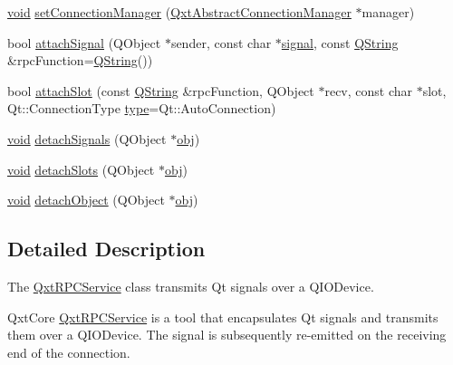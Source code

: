 \begin{DoxyCompactItemize}
\item 
\hyperlink{group___u_a_v_objects_plugin_ga444cf2ff3f0ecbe028adce838d373f5c}{void} \hyperlink{class_qxt_r_p_c_service_ae4246182fe7a84119fb37e90eb9cccf7}{set\-Connection\-Manager} (\hyperlink{class_qxt_abstract_connection_manager}{Qxt\-Abstract\-Connection\-Manager} $\ast$manager)
\item 
bool \hyperlink{class_qxt_r_p_c_service_adc5ae895c4fc3194254af52eda31aa6d}{attach\-Signal} (Q\-Object $\ast$sender, const char $\ast$\hyperlink{qxtdaemon_8h_aa2d2a7a3fc548ea76dcbc5e441b51260}{signal}, const \hyperlink{group___u_a_v_objects_plugin_gab9d252f49c333c94a72f97ce3105a32d}{Q\-String} \&rpc\-Function=\hyperlink{group___u_a_v_objects_plugin_gab9d252f49c333c94a72f97ce3105a32d}{Q\-String}())
\item 
bool \hyperlink{class_qxt_r_p_c_service_a6166ed6737dba6215aa5093656bbe37d}{attach\-Slot} (const \hyperlink{group___u_a_v_objects_plugin_gab9d252f49c333c94a72f97ce3105a32d}{Q\-String} \&rpc\-Function, Q\-Object $\ast$recv, const char $\ast$slot, Qt\-::\-Connection\-Type \hyperlink{glext_8h_a7d05960f4f1c1b11f3177dc963a45d86}{type}=Qt\-::\-Auto\-Connection)
\item 
\hyperlink{group___u_a_v_objects_plugin_ga444cf2ff3f0ecbe028adce838d373f5c}{void} \hyperlink{class_qxt_r_p_c_service_a68a87fe3f5491baa1c745e9680881eea}{detach\-Signals} (Q\-Object $\ast$\hyperlink{glext_8h_a0c0d4701a6c89f4f7f0640715d27ab26}{obj})
\item 
\hyperlink{group___u_a_v_objects_plugin_ga444cf2ff3f0ecbe028adce838d373f5c}{void} \hyperlink{class_qxt_r_p_c_service_a88ca491af26eb487d6bbe3a15e210642}{detach\-Slots} (Q\-Object $\ast$\hyperlink{glext_8h_a0c0d4701a6c89f4f7f0640715d27ab26}{obj})
\item 
\hyperlink{group___u_a_v_objects_plugin_ga444cf2ff3f0ecbe028adce838d373f5c}{void} \hyperlink{class_qxt_r_p_c_service_af8c18776b34e4da35df553aa0618d6bf}{detach\-Object} (Q\-Object $\ast$\hyperlink{glext_8h_a0c0d4701a6c89f4f7f0640715d27ab26}{obj})
\end{DoxyCompactItemize}


\subsection{Detailed Description}
The \hyperlink{class_qxt_r_p_c_service}{Qxt\-R\-P\-C\-Service} class transmits Qt signals over a Q\-I\-O\-Device. 

Qxt\-Core \hyperlink{class_qxt_r_p_c_service}{Qxt\-R\-P\-C\-Service} is a tool that encapsulates Qt signals and transmits them over a Q\-I\-O\-Device. The signal is subsequently re-\/emitted on the receiving end of the connection.

